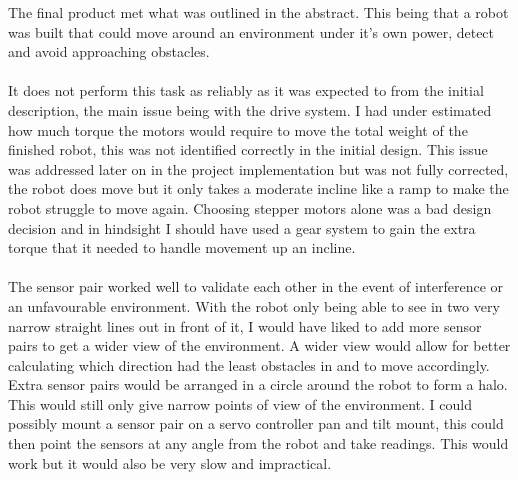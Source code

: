 The final product met what was outlined in the abstract.  This being that a robot was built that could move around an environment under it's own power, detect and avoid approaching obstacles.
\\\\It does not perform this task as reliably as it was expected to from the initial description, the main issue being with the drive system.  I had under estimated how much torque the motors would require to move the total weight of the finished robot, this was not identified correctly in the initial design.  This issue was addressed later on in the project implementation but was not fully corrected, the robot does move but it only takes a moderate incline like a ramp to make the robot struggle to move again.  Choosing stepper motors alone was a bad design decision and in hindsight I should have used a gear system to gain the extra torque that it needed to handle movement up an incline.
\\\\The sensor pair worked well to validate each other in the event of interference or an unfavourable environment.  With the robot only being able to see in two very narrow straight lines out in front of it, I would have liked to add more sensor pairs to get a wider view of the environment.  A wider view would allow for better calculating which direction had the least obstacles in and to move accordingly.
\\Extra sensor pairs would be arranged in a circle around the robot to form a halo.  This would still only give narrow points of view of the environment.  I could possibly mount a sensor pair on a servo controller pan and tilt mount, this could then point the sensors at any angle from the robot and take readings.  This would work but it would also be very slow and impractical.
